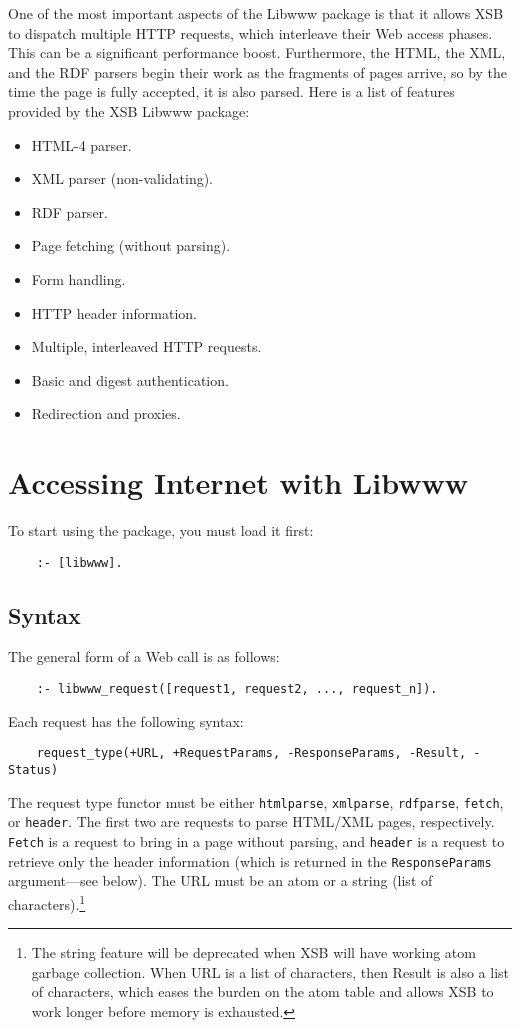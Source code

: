 One of the most important aspects of the Libwww package is that it allows
XSB to dispatch multiple HTTP requests, which interleave their Web access
phases. This can be a significant performance boost. Furthermore, the HTML,
the XML, and the RDF parsers begin their work as the fragments of pages
arrive, so by the time the page is fully accepted, it is also parsed. Here
is a list of features provided by the XSB Libwww package:
\begin{itemize}
  \item  HTML-4 parser.
  \item  XML parser (non-validating).
  \item  RDF parser.
  \item  Page fetching (without parsing).
  \item  Form handling.
  \item  HTTP header information.
  \item  Multiple, interleaved HTTP requests.
  \item  Basic and digest authentication.
  \item  Redirection and proxies.
\end{itemize}

\section{Accessing Internet with Libwww}

To start using the package, you must load it first:
\begin{verbatim}
    :- [libwww].  
\end{verbatim}

\subsection{Syntax}

The general form of a Web call is as follows:

\begin{verbatim}
    :- libwww_request([request1, request2, ..., request_n]).  
\end{verbatim}
Each request has the following syntax:
\begin{verbatim}
    request_type(+URL, +RequestParams, -ResponseParams, -Result, -Status)
\end{verbatim}
The request type functor must be either {\tt htmlparse}, {\tt xmlparse},
{\tt rdfparse}, {\tt fetch}, or {\tt header}. The first two are requests to
parse HTML/XML pages, respectively. {\tt Fetch} is a request to bring in a
page without parsing, and {\tt header} is a request to retrieve only the
header information (which is returned in the {\tt ResponseParams}
argument---see below).
The URL must be an atom or a string (list of characters).\footnote{
  The string feature will be deprecated when XSB will have working atom
  garbage collection. When URL is a list of characters, then Result is also
  a list of characters, which eases the burden on the atom table and allows
  XSB to work longer before memory is exhausted.
  }

